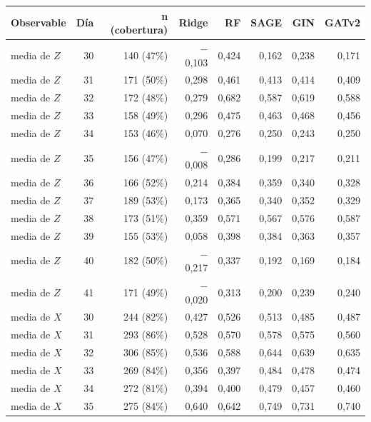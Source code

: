 \begin{table}[htbp]
    \centering
    {\footnotesize
    \begin{tabular}{@{}lrrrrrrr@{}}
        \toprule
        \textbf{Observable} & \textbf{Día} & \textbf{n (cobertura)} & \textbf{Ridge} & \textbf{RF} & \textbf{SAGE} & \textbf{GIN} & \textbf{GATv2} \\
        \midrule
        media de $Z$ & 30 & 140 (47\%) & $-$0,103 & 0,424 & 0,162 & 0,238 & 0,171 \\
        media de $Z$ & 31 & 171 (50\%) & 0,298 & 0,461 & 0,413 & 0,414 & 0,409 \\
        media de $Z$ & 32 & 172 (48\%) & 0,279 & 0,682 & 0,587 & 0,619 & 0,588 \\
        media de $Z$ & 33 & 158 (49\%) & 0,296 & 0,475 & 0,463 & 0,468 & 0,456 \\
        media de $Z$ & 34 & 153 (46\%) & 0,070 & 0,276 & 0,250 & 0,243 & 0,250 \\
        media de $Z$ & 35 & 156 (47\%) & $-$0,008 & 0,286 & 0,199 & 0,217 & 0,211 \\
        media de $Z$ & 36 & 166 (52\%) & 0,214 & 0,384 & 0,359 & 0,340 & 0,328 \\
        media de $Z$ & 37 & 189 (53\%) & 0,173 & 0,365 & 0,340 & 0,352 & 0,329 \\
        media de $Z$ & 38 & 173 (51\%) & 0,359 & 0,571 & 0,567 & 0,576 & 0,587 \\
        media de $Z$ & 39 & 155 (53\%) & 0,058 & 0,398 & 0,384 & 0,363 & 0,357 \\
        media de $Z$ & 40 & 182 (50\%) & $-$0,217 & 0,337 & 0,192 & 0,169 & 0,184 \\
        media de $Z$ & 41 & 171 (49\%) & $-$0,020 & 0,313 & 0,200 & 0,239 & 0,240 \\
        media de $X$ & 30 & 244 (82\%) & 0,427 & 0,526 & 0,513 & 0,485 & 0,487 \\
        media de $X$ & 31 & 293 (86\%) & 0,528 & 0,570 & 0,578 & 0,575 & 0,560 \\
        media de $X$ & 32 & 306 (85\%) & 0,536 & 0,588 & 0,644 & 0,639 & 0,635 \\
        media de $X$ & 33 & 269 (84\%) & 0,356 & 0,397 & 0,484 & 0,478 & 0,474 \\
        media de $X$ & 34 & 272 (81\%) & 0,394 & 0,400 & 0,479 & 0,457 & 0,460 \\
        media de $X$ & 35 & 275 (84\%) & 0,640 & 0,642 & 0,749 & 0,731 & 0,740 \\

\end{tabular}}
\end{table}
